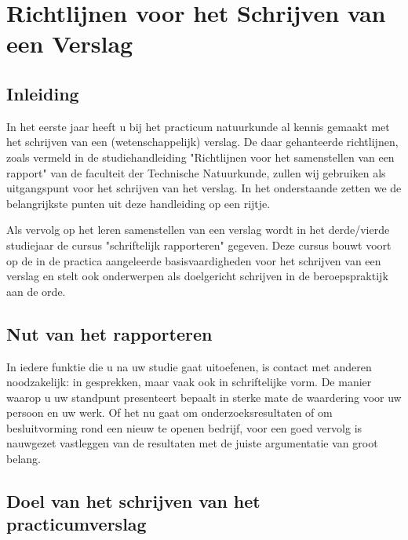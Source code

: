 \section{Richtlijnen voor het Schrijven van een Verslag}

\subsection{Inleiding}

In het eerste jaar heeft u bij het practicum natuurkunde al kennis gemaakt met 
het schrijven van een (wetenschappelijk) verslag.
De daar gehanteerde richtlijnen,
zoals vermeld in de studiehandleiding "Richtlijnen voor het samenstellen
van een rapport" van de faculteit der Technische Natuurkunde, zullen wij 
gebruiken als uitgangspunt voor het schrijven van het verslag. In 
het onderstaande zetten we de belangrijkste punten uit deze handleiding op een 
rijtje.

Als vervolg op het leren samenstellen van een verslag wordt in het
derde/vierde studiejaar de cursus "schriftelijk rapporteren" gegeven.
Deze cursus bouwt 
voort op de in de practica aangeleerde basisvaardigheden voor het schrijven 
van een verslag en stelt ook onderwerpen als doelgericht schrijven in de 
beroepspraktijk aan de orde. 

\subsection{Nut van het rapporteren }

In iedere funktie die u na uw studie gaat uitoefenen, is contact met anderen 
noodzakelijk: in gesprekken, maar vaak ook in schriftelijke vorm. De manier 
waarop u uw standpunt presenteert bepaalt in sterke mate de waardering voor 
uw persoon en uw werk. Of het nu gaat om onderzoeksresultaten of om 
besluitvorming rond een nieuw te openen bedrijf, voor een goed vervolg is nauwgezet 
vastleggen van de resultaten met de juiste argumentatie van groot belang. 

\subsection{Doel van het schrijven van het practicumverslag }


